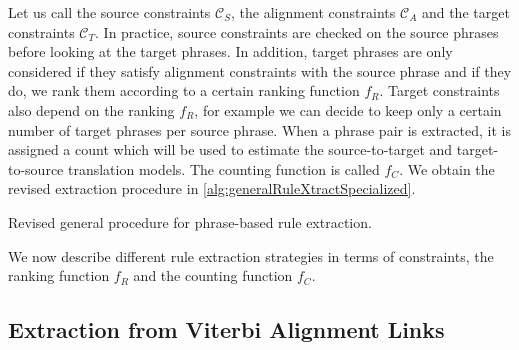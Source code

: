 Let us call the source constraints $\mathcal{C}_S$, the alignment constraints
$\mathcal{C}_A$ and the target constraints $\mathcal{C}_T$. In practice, source
constraints are checked on the source phrases before looking
at the target phrases. In addition, target phrases are only considered if they
satisfy alignment constraints with the source phrase and if they do, we rank
them according to a certain ranking function $f_R$. Target constraints also
depend on the ranking $f_R$, for example we can decide to keep only a certain
number of target phrases per source phrase. When a phrase pair is extracted, it
is assigned a count which will be used to estimate the source-to-target and
target-to-source translation models. The counting function is called $f_C$. We
obtain the revised extraction procedure in
\autoref{alg:generalRuleXtractSpecialized}.
%
\begin{algorithm}
  \caption{Revised general procedure for phrase-based rule extraction.}
  \label{alg:generalRuleXtractSpecialized}
  \begin{algorithmic}[1]
         
        \EndIf
         
           
          \EndIf
        \EndFor
         
           
          \EndIf
        \EndFor
      \EndFor
    \EndFunction
  \end{algorithmic}
\end{algorithm}
%
We now describe different rule extraction strategies in terms of constraints,
the ranking function $f_R$ and the counting function $f_C$.
    
\subsection{Extraction from Viterbi Alignment Links}
\label{sec:extractionFromPosteriorsViterbi}

